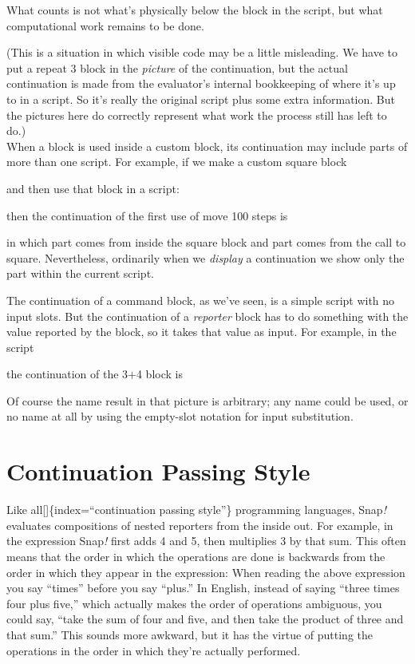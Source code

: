 \documentclass[
  letterpaper,
]{book}
\begin{document}
What counts is not what's physically below the block in the script, but
what computational work remains to be done.

(This is a situation in which visible code may be a little misleading.
We have to put a repeat 3 block in the \emph{picture} of the
continuation, but the actual continuation is made from the evaluator's
internal bookkeeping of where it's up to in a script. So it's really the
original script plus some extra information. But the pictures here do
correctly represent what work the process still has left to do.)\\
When a block is used inside a custom block, its continuation may include
parts of more than one script. For example, if we make a custom square
block

and then use that block in a script:

then the continuation of the first use of move 100 steps is

in which part comes from inside the square block and part comes from the
call to square. Nevertheless, ordinarily when we \emph{display} a
continuation we show only the part within the current script.

The continuation of a command block, as we've seen, is a simple script
with no input slots. But the continuation of a \emph{reporter} block has
to do something with the value reported by the block, so it takes that
value as input. For example, in the script

the continuation of the 3+4 block is

Of course the name result in that picture is arbitrary; any name could
be used, or no name at all by using the empty-slot notation for input
substitution.

\section{Continuation Passing Style}\label{continuation-passing-style}

Like all{[}{]}\{index=``continuation passing style''\} programming
languages, Snap\emph{!} evaluates compositions of nested reporters from
the inside out. For example, in the expression Snap\emph{!} first adds 4
and 5, then multiplies 3 by that sum. This often means that the order in
which the operations are done is backwards from the order in which they
appear in the expression: When reading the above expression you say
``times'' before you say ``plus.'' In English, instead of saying ``three
times four plus five,'' which actually makes the order of operations
ambiguous, you could say, ``take the sum of four and five, and then take
the product of three and that sum.'' This sounds more awkward, but it
has the virtue of putting the operations in the order in which they're
actually performed.
\end{document}

